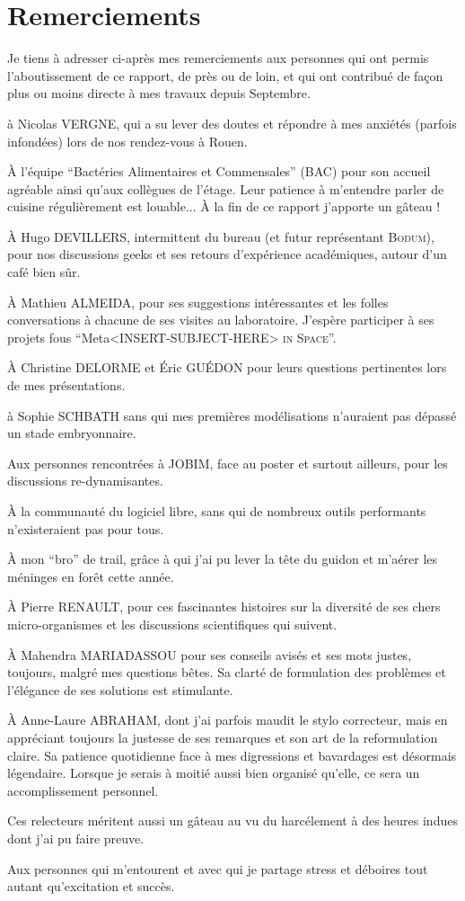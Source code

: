 \section*{Remerciements}
Je tiens à adresser ci-après mes remerciements aux personnes qui ont permis l'aboutissement de ce rapport, de près ou de loin, et qui ont contribué de façon plus ou moins directe à mes travaux depuis Septembre.

à Nicolas VERGNE, qui a su lever des doutes et répondre à mes anxiétés (parfois infondées) lors de nos rendez-vous à Rouen.

À l'équipe ``Bactéries Alimentaires et Commensales'' (BAC) pour son accueil agréable ainsi qu'aux collègues de l'étage.
Leur patience à m'entendre parler de cuisine régulièrement est louable... À la fin de ce rapport j'apporte un gâteau !

À Hugo DEVILLERS, intermittent du bureau (et futur représentant \textsc{Bodum}), pour nos discussions geeks et ses retours d'expérience académiques, autour d'un café bien sûr.

À Mathieu ALMEIDA, pour ses suggestions intéressantes et les folles conversations à chacune de ses visites au laboratoire. J'espère participer à ses projets fous ``Meta<INSERT-SUBJECT-HERE> \textsc{in Space}''.

À Christine DELORME et Éric GUÉDON pour leurs questions pertinentes lors de mes présentations.

à Sophie SCHBATH sans qui mes premières modélisations n'auraient pas dépassé un stade embryonnaire.

Aux personnes rencontrées à JOBIM, face au poster et surtout ailleurs, pour les discussions re-dynamisantes.

À la communauté du logiciel libre, sans qui de nombreux outils performants n'existeraient pas pour tous.

À mon ``bro'' de trail, grâce à qui j'ai pu lever la tête du guidon et m'aérer les méninges en forêt cette année.


À Pierre RENAULT, pour ces fascinantes histoires sur la diversité de ses chers micro-organismes et les discussions scientifiques qui suivent.

À Mahendra MARIADASSOU pour ses conseils avisés et ses mots justes, toujours, malgré mes questions bêtes. Sa clarté de formulation des problèmes et l'élégance de ses solutions est stimulante.

À Anne-Laure ABRAHAM, dont j'ai parfois maudit le stylo correcteur, mais en appréciant toujours la justesse de ses remarques et son art de la reformulation claire. Sa patience quotidienne face à mes digressions et bavardages est désormais légendaire.  Lorsque je serais à moitié aussi bien organisé qu'elle, ce sera un accomplissement personnel.

Ces relecteurs méritent aussi un gâteau au vu du harcélement à des heures indues dont j'ai pu faire preuve.


Aux personnes qui m'entourent et avec qui je partage stress et déboires tout autant qu'excitation et succès.
